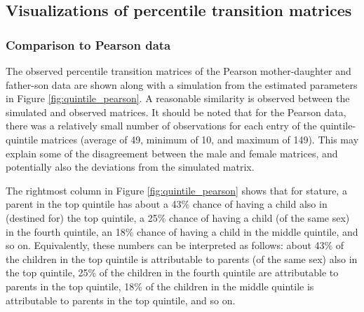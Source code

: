 \documentclass[a4paper,11pt]{article} %
\begin{document}
\subsection{Visualizations of percentile transition matrices}

\subsubsection*{Comparison to Pearson data}

The observed percentile transition matrices of the Pearson mother-daughter and father-son data are shown along with a simulation from the estimated parameters in Figure \ref{fig:quintile_pearson}. A reasonable similarity is observed between the simulated and observed matrices. It should be noted that for the Pearson data, there was a relatively small number of observations for each entry of the quintile-quintile matrices (average of 49, minimum of 10, and maximum of 149). This may explain some of the disagreement between the male and female matrices, and potentially also the deviations from the simulated matrix. 

The rightmost column in Figure \ref{fig:quintile_pearson} shows that for stature, a parent in the top quintile has about a 43\% chance of having a child also in (destined for) the top quintile, a 25\% chance of having a child (of the same sex) in the fourth quintile, an 18\% chance of having a child in the middle quintile, and so on. Equivalently, these numbers can be interpreted as follows: about 43\% of the children in the top quintile is attributable to parents (of the same sex) also in the top quintile, 25\% of the children in the fourth quintile are attributable to parents in the top quintile, 18\% of the children in the middle quintile is attributable to parents in the top quintile, and so on. 
\end{document}
